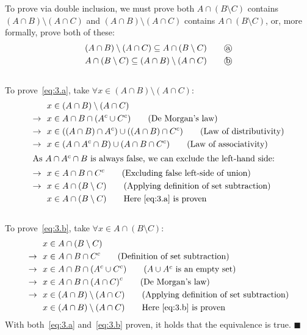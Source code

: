 \documentclass[12pt]{article}
\begin{document}
To prove via double inclusion, we must prove both $A \cap (B \setminus C)$ contains $(A \cap B) \setminus (A \cap C)$ and $(A \cap B) \setminus (A \cap C)$ contains $A \cap (B \setminus C)$, or, more formally, prove both of these:
\begin{align}
  & (A \cap B) \setminus (A \cap C) \subseteq A \cap (B \setminus C) \tag*{\textcircled{a}} \label{eq:3.a} \\
  & A \cap (B \setminus C) \subseteq (A \cap B) \setminus (A \cap C) \tag*{\textcircled{b}} \label{eq:3.b}
\end{align}
\\
\noindent To prove\ \ref{eq:3.a}, take $\forall x \in (A \cap B) \setminus (A \cap C)$:
\begin{align*}
    & x \in (A \cap B) \setminus (A \cap C) \\
    \rightarrow\ \ & x \in A \cap B \cap (A^{c} \cup C^{c}) \tag{De Morgan's law} \\
    \rightarrow\ \ & x \in ((A \cap B) \cap A^{c}) \cup ((A \cap B) \cap C^{c}) \tag{Law of distributivity} \\
    \rightarrow\ \ & x \in (A \cap A^{c} \cap B) \cup (A \cap B \cap C^{c}) \tag{Law of associativity} \\
  \intertext{As $A \cap A^{c} \cap B$ is always false, we can exclude the left-hand side:}
    \rightarrow\ \ & x \in A \cap B \cap C^{c} \tag{Excluding false left-side of union} \\
    \rightarrow\ \ & x \in A \cap (B \setminus C) \tag{Applying definition of set subtraction} \\
    & x \in A \cap (B \setminus C) \tag*{Here\ \ref{eq:3.a} is proven}
\end{align*}
\\
\noindent To prove\ \ref{eq:3.b}, take $\forall x \in A \cap (B \setminus C)$:
\begin{align*}
    & x \in A \cap (B \setminus C) \\
    \rightarrow\ \ & x \in A \cap B \cap C^{c} \tag{Definition of set subtraction} \\
    \rightarrow\ \ & x \in A \cap B \cap (A^{c} \cup C^{c}) \tag{\begin{math}A \cup A^{c}\end{math} is an empty set} \\
    \rightarrow\ \ & x \in A \cap B \cap {(A \cap C)}^{c} \tag{De Morgan's law} \\
    \rightarrow\ \ & x \in (A \cap B) \setminus (A \cap C) \tag{Applying definition of set subtraction} \\
    & x \in (A \cap B) \setminus (A \cap C) \tag*{Here\ \ref{eq:3.b} is proven} \\
\end{align*}
With both\ \ref{eq:3.a} and\ \ref{eq:3.b} proven, it holds that the equivalence is true. \hfill $\blacksquare$
\pagebreak
\end{document}
